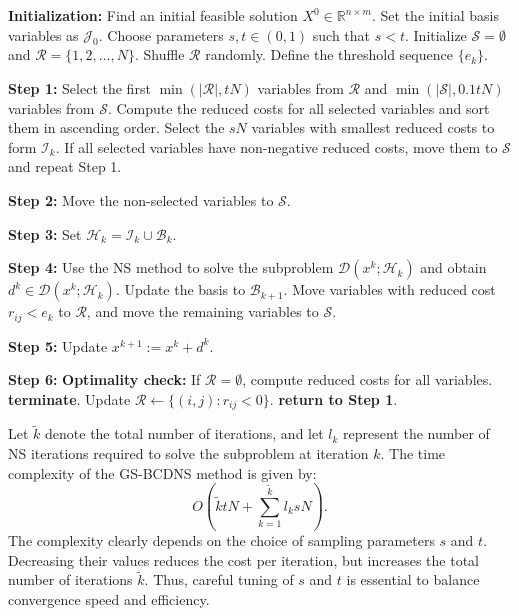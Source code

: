 \documentclass[12pt,a4paper]{article}
\begin{document}
\begin{algorithm}[H]
\caption{Grouped Selection Block Coordinate Descent Network Simplex Method (GS-BCDNS)}
\label{alg:bcd_nsm}
\begin{algorithmic}
\State \textbf{Initialization:} 
\State Find an initial feasible solution \( X^0 \in \mathbb{R}^{n \times m} \). Set the initial basis variables as \( \mathcal{J}_0 \). Choose parameters \( s, t \in (0, 1) \) such that \( s < t \).
Initialize \( \mathcal{S} = \emptyset \) and \( \mathcal{R} = \{1, 2, \ldots, N\} \). Shuffle \( \mathcal{R} \) randomly. Define the threshold sequence \( \{ e_k \} \). 

    \State \textbf{Step 1:} Select the first \( \min(|\mathcal{R}|, tN) \) variables from \( \mathcal{R} \) and \( \min(|\mathcal{S}|, 0.1tN) \) variables from \( \mathcal{S} \). Compute the reduced costs for all selected variables and sort them in ascending order. Select the \( sN \) variables with smallest reduced costs to form \( \mathcal{I}_k \). If all selected variables have non-negative reduced costs, move them to \( \mathcal{S} \) and repeat Step 1.
    
    \State \textbf{Step 2:} Move the non-selected variables to \( \mathcal{S} \).
    
    \State \textbf{Step 3:} Set \( \mathcal{H}_k = \mathcal{I}_k \cup \mathcal{B}_k \).
    
    \State \textbf{Step 4:} Use the NS method to solve the subproblem \(\mathcal{D}(x^k; \mathcal{H}_k) \) and obtain \( d^k \in \mathcal{D}(x^k; \mathcal{H}_k) \). Update the basis to \( \mathcal{B}_{k+1} \). Move variables with reduced cost \( r_{ij} < e_k \) to \( \mathcal{R} \), and move the remaining variables to \( \mathcal{S} \).
    
    \State \textbf{Step 5:} Update \( x^{k+1} := x^k + d^k \).
    
    \State \textbf{Step 6:} \textbf{Optimality check:} If $\mathcal{R}=\emptyset$, compute reduced costs for all variables.
        \State \textbf{terminate}.
    \Else
        \State Update $\mathcal{R}\gets \{(i,j): r_{ij}<0\}$.
        \State \textbf{return to Step 1}.
    \EndIf
    
\EndFor    
\end{algorithmic}
\end{algorithm}


Let \( \tilde{k} \) denote the total number of iterations, and let \( l_k \) represent the number of NS iterations required to solve the subproblem at iteration \( k \). The time complexity of the GS-BCDNS method is given by:
\[
O\left( \tilde{k} tN + \sum_{k=1}^{\tilde{k}} l_k sN \right).
\]
The complexity clearly depends on the choice of sampling parameters \( s \) and \( t \). Decreasing their values reduces the cost per iteration, but increases the total number of iterations \( \tilde{k} \). Thus, careful tuning of \( s \) and \( t \) is essential to balance convergence speed and efficiency.
\end{document}

